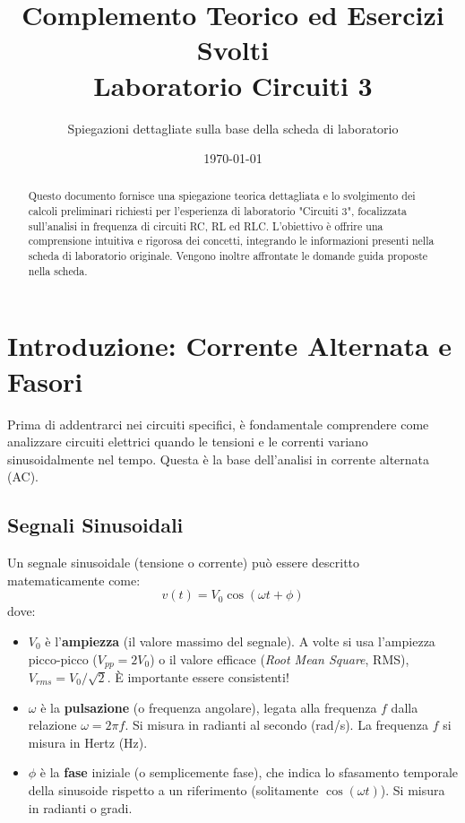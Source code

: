 \documentclass[a4paper, 11pt]{article}
\title{Complemento Teorico ed Esercizi Svolti \\ Laboratorio Circuiti 3}
\author{Spiegazioni dettagliate sulla base della scheda di laboratorio}
\date{\today}
\begin{document}
\maketitle

\begin{abstract}
Questo documento fornisce una spiegazione teorica dettagliata e lo svolgimento dei calcoli preliminari richiesti per l'esperienza di laboratorio "Circuiti 3", focalizzata sull'analisi in frequenza di circuiti RC, RL ed RLC. L'obiettivo è offrire una comprensione intuitiva e rigorosa dei concetti, integrando le informazioni presenti nella scheda di laboratorio originale. Vengono inoltre affrontate le domande guida proposte nella scheda.
\end{abstract}

\tableofcontents

\newpage

\section*{Introduzione: Corrente Alternata e Fasori}

Prima di addentrarci nei circuiti specifici, è fondamentale comprendere come analizzare circuiti elettrici quando le tensioni e le correnti variano sinusoidalmente nel tempo. Questa è la base dell'analisi in corrente alternata (AC).

\subsection*{Segnali Sinusoidali}
Un segnale sinusoidale (tensione o corrente) può essere descritto matematicamente come:
\begin{equation}
    v(t) = V_0 \cos(\omega t + \phi)
\end{equation}
dove:
\begin{itemize}
    \item $V_0$ è l'\textbf{ampiezza} (il valore massimo del segnale). A volte si usa l'ampiezza picco-picco ($V_{pp} = 2V_0$) o il valore efficace (\textit{Root Mean Square}, RMS), $V_{rms} = V_0 / \sqrt{2}$. È importante essere consistenti!
    \item $\omega$ è la \textbf{pulsazione} (o frequenza angolare), legata alla frequenza $f$ dalla relazione $\omega = 2\pi f$. Si misura in radianti al secondo (\si{rad/s}). La frequenza $f$ si misura in Hertz (\si{Hz}).
    \item $\phi$ è la \textbf{fase} iniziale (o semplicemente fase), che indica lo sfasamento temporale della sinusoide rispetto a un riferimento (solitamente $\cos(\omega t)$). Si misura in radianti o gradi.
\end{itemize}
\end{document}
